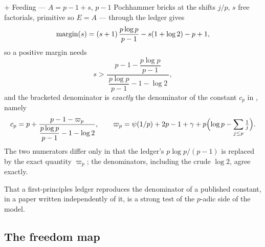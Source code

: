\begin{finding}\label{find:LLS}
\DERIVED{} +  Feeding \cite[Def.~3.1]{LLS2025} --- $A=p-1+s$,
$p-1$ Pochhammer bricks at the shifts $j/p$, $s$ free factorials, primitive so $E=A$ ---
through the ledger gives
\[
 \operatorname{margin}(s)=(s+1)\,\frac{p\log p}{p-1}-s(1+\log2)-p+1,
\]
so a positive margin needs
\[
 s>\frac{p-1-\dfrac{p\log p}{p-1}}{\ \dfrac{p\log p}{p-1}-1-\log 2\ },
\]
and the bracketed denominator is \emph{exactly} the denominator of the constant $c_p$ in
\cite[Thm.~1.1]{LLS2025}, namely
\[
 c_p=p+\frac{p-1-\varpi_p}{\dfrac{p\log p}{p-1}-1-\log2},
 \qquad
 \varpi_p=\psi(1/p)+2p-1+\gamma+p\Bigl(\log p-\sum_{j\le p}\tfrac1j\Bigr).
\]
The two numerators differ only in that the ledger's $p\log p/(p-1)$ is replaced by the
exact quantity $\varpi_p$; the denominators, including the crude $\log2$, agree exactly.
\end{finding}

That a first-principles ledger reproduces the denominator of a published constant, in a
paper written independently of it, is a strong test of the $p$-adic side of the model.

\subsection{The freedom map}\label{ss:freedom}

